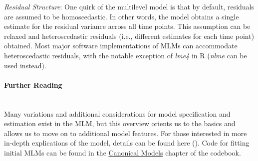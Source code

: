 \documentclass[11pt]{article}
\newcommand{\subsubsubsection}[1]{\paragraph{#1}\mbox{}\\}  %
\begin{document}
\qquad \textit{Residual Structure}: One quirk of the multilevel model is that by default, residuals are assumed to be homoscedastic. In other words, the model obtains a single estimate for the residual variance across all time points. This assumption can be relaxed and heteroscedastic residuals (i.e., different estimates for each time point) obtained. Most major software implementations of MLMs can accommodate heteroscedastic residuals, with the notable exception of \textit{lme4} in R (\textit{nlme} can be used instead).

\subsubsubsection{Further Reading}
Many variations and additional considerations for model specification and estimation exist in the MLM, but this overview orients us to the basics and allows us to move on to additional model features. For those interested in more in-depth explications of the model, details can be found here (\cite{curran_disaggregation_2011,mcneish_unnecessary_2017,raudenbush_hierarchical_2002,singer_applied_2003}). Code for fitting initial MLMs can be found in the \href{https://e-m-mccormick.github.io/static/longitudinal-primer/02-canonical.html#multilevel-model}{Canonical Models} chapter of the codebook.
\end{document}
